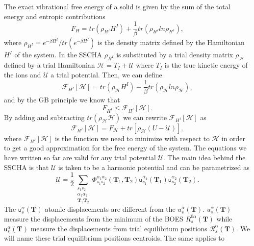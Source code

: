The exact vibrational free energy of a solid is given by the sum of the total energy and entropic contributions
\begin{equation}
 F_{H}=tr(\rho_{H^{I}}H^{I})+\frac{1}{\beta}tr(\rho_{H^{I}}ln\rho_{H^{I}}),
\end{equation}
where $\rho_{H^{I}}=e^{-\beta H^{I}}/tr(e^{-\beta H^{I}})$ is the density matrix defined by the Hamiltonian $H^{I}$ of the system. In the SSCHA $\rho_{H^{I}}$ is substituted by a trial density matrix $\rho_{\mathcal{H}}$ defined 
by a trial Hamiltonian $\mathcal{H}=T_{I}+\mathcal{U}$ where $T_{I}$ is the true kinetic energy of the ions and $\mathcal{U}$ a trial potential. Then, we can define
\begin{equation}
 \mathcal{F}_{H^{I}}[\mathcal{H}]=tr(\rho_{\mathcal{H}}H^{I})+\frac{1}{\beta}tr(\rho_{\mathcal{H}}ln\rho_{\mathcal{H}}),
\end{equation}
and by the GB principle we know that
\begin{equation}
 F_{H^{I}}\le\mathcal{F}_{H^{I}}[\mathcal{H}].
\end{equation} 
By adding and subtracting $tr(\rho_{\mathcal{H}}\mathcal{H})$ we can rewrite $\mathcal{F}_{H^{I}}[\mathcal{H}]$ as
\begin{equation}
 \label{scha-equation}
 \mathcal{F}_{H^{I}}[\mathcal{H}]=F_{\mathcal{H}}+tr[\rho_{\mathcal{H}}(U-\mathcal{U})],
\end{equation}
where $\mathcal{F}_{H^{I}}[\mathcal{H}]$ is the function we need to minimize with respect to $\mathcal{H}$ in order to get a good approximation for the free energy of the system. The equations we have written so far are valid 
for any trial potential $\mathcal{U}$. The main idea behind the SSCHA is that $\mathcal{U}$ is taken to be a harmonic potential and can be parametrized as
\begin{equation}
 \mathcal{U}=\frac{1}{2}\sum\limits_{\substack{s_{1}s_{2} \\ \alpha_{1}\alpha_{2} \\ \mathbf{T}_{1}\mathbf{T}_{2}}}\Phi_{s_{1}s_{2}}^{\alpha_{1}\alpha_{2}}(\mathbf{T}_{1},\mathbf{T}_{2})\mathsf{u}_{s_{1}}^{
 \alpha_{1}}(\mathbf{T}_{1})\mathsf{u}_{s_{2}}^{\alpha_{2}}(\mathbf{T}_{2}).
\end{equation}
The $\mathsf{u}_{s}^{\alpha}(\mathbf{T})$ atomic displacements are different from the $u_{s}^{\alpha}(\mathbf{T})$. $u_{s}^{\alpha}(\mathbf{T})$ measure the displacements from the minimum of the BOES $R_{s}^{0\alpha}(\mathbf{T})$
while $\mathsf{u}_{s}^{\alpha}(\mathbf{T})$ measure the displacements from trial equilibrium positions $\mathcal{R}_{s}^{\alpha}(\mathbf{T})$. We will name these trial equilibrium positions centroids. The same applies to 
